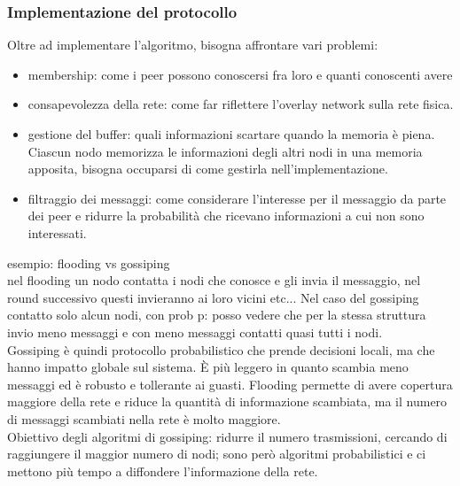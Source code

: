 \documentclass[16px]{article}
\begin{document}
\subsubsection{Implementazione del protocollo}
Oltre ad implementare l'algoritmo, bisogna affrontare vari problemi:
\begin{itemize}
\item membership: come i peer possono conoscersi fra loro e quanti conoscenti avere
\item consapevolezza della rete: come far riflettere l'overlay network sulla rete fisica.
\item gestione del buffer: quali informazioni scartare quando la memoria è piena. Ciascun nodo memorizza le informazioni degli altri nodi in una memoria apposita, bisogna occuparsi di come gestirla nell'implementazione.
\item filtraggio dei messaggi: come considerare l'interesse per il messaggio da parte dei peer e ridurre la probabilità che ricevano informazioni a cui non sono interessati.
\end{itemize}
esempio: flooding vs gossiping\\ nel flooding un nodo contatta i nodi che conosce e gli invia il messaggio, nel round successivo questi invieranno ai loro vicini etc... Nel caso del gossiping contatto solo alcun nodi, con prob p: posso vedere che per la stessa struttura invio meno messaggi e con meno messaggi contatti quasi tutti i nodi.\\ Gossiping è quindi protocollo probabilistico che prende decisioni locali, ma che hanno impatto globale sul sistema. È più leggero in quanto scambia meno messaggi ed è robusto e tollerante ai guasti. Flooding permette di avere copertura maggiore della rete e riduce la quantità di  informazione scambiata, ma il numero di messaggi scambiati nella rete è molto maggiore. \\Obiettivo degli algoritmi di gossiping: ridurre il numero trasmissioni, cercando di raggiungere il maggior numero di nodi; sono però algoritmi probabilistici e ci mettono più tempo a diffondere l'informazione della rete.
\end{document}

